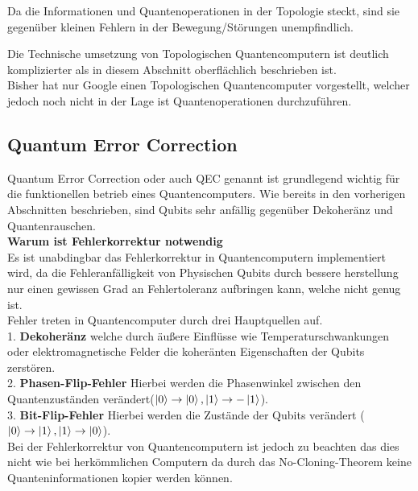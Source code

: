 Da die Informationen und Quantenoperationen in der Topologie steckt, sind sie gegenüber kleinen Fehlern in der Bewegung/Störungen unempfindlich.\\

\begin{tcolorbox}[title=Kommentar,
    title filled=false,
    colback=cyan!5!white,
    colframe=cyan!75!black]
    Die Technische umsetzung von Topologischen Quantencomputern ist deutlich komplizierter als in diesem Abschnitt oberflächlich beschrieben ist.\\
    Bisher hat nur Google einen Topologischen Quantencomputer vorgestellt, welcher jedoch noch nicht in der Lage ist Quantenoperationen durchzuführen.
\end{tcolorbox}

\subsection{Quantum Error Correction}
\label{sub:quantum_error_correction}
Quantum Error Correction oder auch QEC genannt ist grundlegend wichtig für die funktionellen betrieb eines Quantencomputers. Wie bereits in den vorherigen Abschnitten beschrieben,
sind Qubits sehr anfällig gegenüber Dekoheränz und Quantenrauschen.\\

\textbf{Warum ist Fehlerkorrektur notwendig}\\
Es ist unabdingbar das Fehlerkorrektur in Quantencomputern implementiert wird, da die Fehleranfälligkeit von Physischen Qubits durch bessere herstellung nur einen gewissen Grad an Fehlertoleranz aufbringen kann, welche nicht genug ist.\\

Fehler treten in Quantencomputer durch drei Hauptquellen auf.\\
1. \textbf{Dekoheränz} welche durch äußere Einflüsse wie Temperaturschwankungen oder elektromagnetische Felder die koheränten Eigenschaften der Qubits zerstören.\\
2. \textbf{Phasen-Flip-Fehler} Hierbei werden die Phasenwinkel zwischen den Quantenzuständen verändert($\ket{0}\rightarrow\ket{0},\ket{1}\rightarrow-\ket{1}$).\\ 
3. \textbf{Bit-Flip-Fehler} Hierbei werden die Zustände der Qubits verändert ($\ket{0}\rightarrow\ket{1},\ket{1}\rightarrow\ket{0}$).\\

Bei der Fehlerkorrektur von Quantencomputern ist jedoch zu beachten das dies nicht wie bei herkömmlichen Computern da durch das No-Cloning-Theorem keine Quanteninformationen kopier werden können.\\

